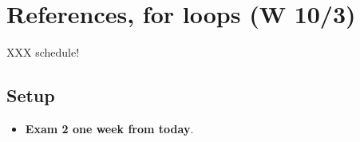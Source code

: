\documentclass{article}
\newenvironment{reflect}[1]
{
  \noindent
  \begin{lrbox}{\reflectbox}
    \begin{minipage}[t]{\textwidth}
      \textbf{#1}:
}{
    \end{minipage}
  \end{lrbox}
  \fbox{\usebox{\reflectbox}}
}
\begin{document}
\newpage
\section{References, for loops (W 10/3)}

XXX schedule!

\subsection*{Setup}
\begin{itemize}
\item \textbf{Exam 2 one week from today}.
\end{itemize}












\end{document}
